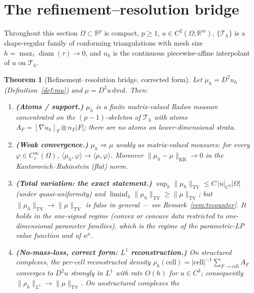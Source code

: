 \documentclass[11pt,a4paper]{article}
\theoremstyle{plain}
\newtheorem{theorem}{Theorem}[section]
\theoremstyle{definition}
\theoremstyle{remark}
\newcommand{\kmu}{\kappa^{\mu}}
\newcommand{\RR}{\mathbb{R}}
\newcommand{\TV}{\mathrm{TV}}
\newcommand{\dvol}{\,\mathrm{dvol}}
\DeclareMathOperator{\KR}{KR}
\begin{document}
\section{The refinement--resolution bridge}
\label{sec:theoremB}

Throughout this section $\Omega \subset \RR^p$ is compact, $p \ge 1$,
$u \in C^2(\Omega; \RR^m)$, $\{\mathcal{T}_h\}$ is a shape-regular family
of conforming triangulations with mesh size
$h = \max_\tau \operatorname{diam}(\tau) \to 0$, and $u_h$ is the
continuous piecewise-affine interpolant of $u$ on $\mathcal{T}_h$.

\begin{theorem}[Refinement--resolution bridge, corrected form]
\label{thm:Bprime}
Let $\mu_h = D^2 u_h$ (Definition~\ref{def:mu}) and
$\mu = D^2u \dvol$. Then:
\begin{enumerate}[label=(\roman*),leftmargin=2em]
\item \textbf{(Atoms / support.)} $\mu_h$ is a finite matrix-valued Radon
      measure concentrated on the $(p-1)$-skeleton of $\mathcal{T}_h$ with
      atoms $A_F = [\nabla u_h]_F \otimes n_F |F|$; there are no atoms on
      lower-dimensional strata.
\item \textbf{(Weak convergence.)} $\mu_h \Rightarrow \mu$ weakly as
      matrix-valued measures: for every
      $\varphi \in C_c^\infty(\Omega)$,
      $\langle \mu_h, \varphi \rangle \to \langle \mu, \varphi \rangle$.
      Moreover $\|\mu_h - \mu\|_{\KR} \to 0$ in the
      Kantorovich--Rubinstein (flat) norm.
\item \textbf{(Total variation: the exact statement.)}
      $\sup_h \|\mu_h\|_{\TV} \le C\,|u|_{C^2}|\Omega|$ (under
      quasi-uniformity) and
      $\liminf_h \|\mu_h\|_{\TV} \ge \|\mu\|_{\TV}$; but
      $\|\mu_h\|_{\TV} \to \|\mu\|_{\TV}$ is \emph{false in general} ---
      see Remark~\ref{rem:tvcounter}. It holds in the one-signed regime
      (convex or concave data restricted to one-dimensional parameter
      families), which is the regime of the parametric-LP value function
      and of $\kmu$.
\item \textbf{(No-mass-loss, correct form: $L^1$ reconstruction.)}
      On structured complexes, the per-cell reconstructed density
      $\rho_h(\mathrm{cell}) = |\mathrm{cell}|^{-1} \sum_{F \to
      \mathrm{cell}} A_F$ converges to $D^2 u$ \emph{strongly in $L^1$}
      with rate $O(h)$ for $u \in C^3$; consequently
      $\|\rho_h\|_{L^1} \to \|\mu\|_{\TV}$. On unstructured complexes the

\end{enumerate}
\end{theorem}
\end{document}
